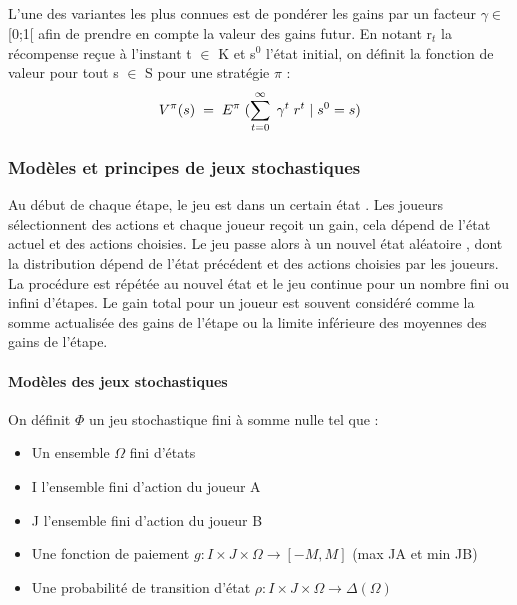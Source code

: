 \documentclass[a4paper, 12pt, twoside]{article}
\begin{document}
{{{{\subparagraph*{}{L'une des variantes les plus connues est de pondérer les gains par un facteur $\gamma \in $ [0;1[ afin de prendre en compte la valeur des gains futur. En notant r$_{t}$ la récompense reçue à l'instant \textsf{t} $ \in $ K et \textsf{s$^{0}$} l'état initial, on définit la \textsf{fonction de valeur} pour tout \textsf{s} $\in $ S pour une stratégie $ \pi$ :}
\begin{align*}
V^{\pi}(s) \hspace{0,1 cm} = \hspace{0,1 cm} E^{\pi}\hspace{0,1 cm} (\sum_{t=0}^{\infty} \hspace{0,1cm}\gamma ^{t} \hspace{0,1cm} r^{t}\hspace{0,1cm} |\hspace{0,1cm} s^{0} = s )
\end{align*}


\subsubsection{Modèles et principes de jeux stochastiques }
Au début de chaque étape, le jeu est dans un certain état . Les joueurs sélectionnent des actions et chaque joueur reçoit un gain, cela dépend de l'état actuel et des actions choisies. Le jeu passe alors à un nouvel état aléatoire , dont la distribution dépend de l'état précédent et des actions choisies par les joueurs. La procédure est répétée au nouvel état et le jeu continue pour un nombre fini ou infini d'étapes. Le gain total pour un joueur est souvent considéré comme la somme actualisée des gains de l'étape ou la limite inférieure des moyennes des gains de l'étape.

\paragraph{Modèles des jeux stochastiques}
On définit $\Phi$ un jeu stochastique fini à somme nulle tel que :
\begin{itemize}
\item Un ensemble $\Omega$ fini d'états
\item I l'ensemble fini d'action du joueur A
\item J l'ensemble fini d'action du joueur B
\item Une fonction de paiement $g : I \times J \times\Omega\rightarrow [ -M,M]$ (max \textsf{JA} et min \textsf{JB})
\item Une probabilité de transition d'état $\rho : I \times J \times \Omega \rightarrow \Delta (\Omega)$
\end{itemize}

}}}}
\end{document}
